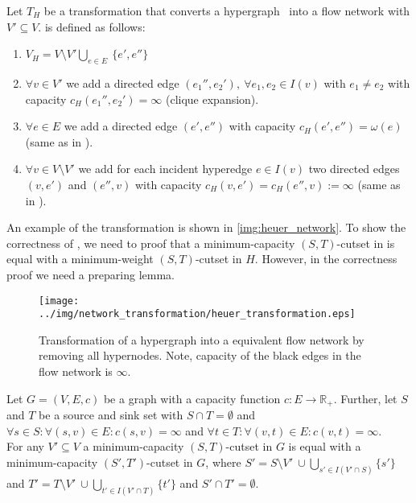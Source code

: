 \begin{definition}
Let $T_H$ be a transformation that converts a hypergraph \HypergraphDef~into 
a flow network  with $V' \subseteq V$.  is defined as follows:
\begin{enumerate}
\item $V_H = V\setminus V' \bigcup\limits_{e \in E}\ \{e', e''\}$
\item $\forall v \in V'$ we add a directed edge $(e_1'', e_2'),\ \forall e_1, e_2 \in I(v)$ 
      with $e_1 \neq e_2$ with capacity $c_H(e_1'', e_2') = \infty$ (clique expansion).
\item $\forall e \in E$ we add a directed edge $(e',e'')$
      with capacity $c_H(e',e'') = \omega(e)$ (same as in ).
\item $\forall v \in V\setminus V'$ we add for each incident hyperedge $e \in I(v)$ two directed
      edges $(v,e')$ and $(e'',v)$ with capacity 
      $c_H(v,e') = c_H(e'',v) := \infty$ (same as in ).
\end{enumerate} 
\end{definition}

An example of the transformation is shown in \autoref{img:heuer_network}. To show
the correctness of , we need to proof that a minimum-capacity $(S,T)$-cutset
in  is equal with a minimum-weight $(S,T)$-cutset in $H$. However,
in the correctness proof we need a preparing lemma.

\begin{figure}
\centering
\texttt{[image: ../img/network\_transformation/heuer\_transformation.eps]}
\caption{Transformation of a hypergraph into a equivalent flow network by removing
         all hypernodes. Note, capacity of the black edges in the flow network is $\infty$.}
\label{img:heuer_network}
\end{figure}

\begin{lemma}
\label{lemma:lemma1}
Let $G = (V,E,c)$ be a graph with a capacity function $c: E \rightarrow \mathbb{R}_+$. Further, 
let $S$ and $T$ be a source and sink set with $S \cap T = \emptyset$ and
$\forall s \in S:\forall (s,v) \in E: c(s,v) = \infty$ and $\forall t 
\in T:\forall (v,t) \in E: c(v,t) = \infty$. \\
For any $V' \subseteq V$ a minimum-capacity $(S,T)$-cutset in $G$ is equal with a minimum-capacity
$(S',T')$-cutset in $G$, where $S' = S\setminus V'\ \cup \bigcup\limits_{s' \in I(V' \cap S)} \{s'\}$ and 
$T' = T\setminus V'\ \cup \bigcup\limits_{t' \in I(V' \cap T)} \{t'\}$ and $S' \cap T' = \emptyset$.
\end{lemma}

